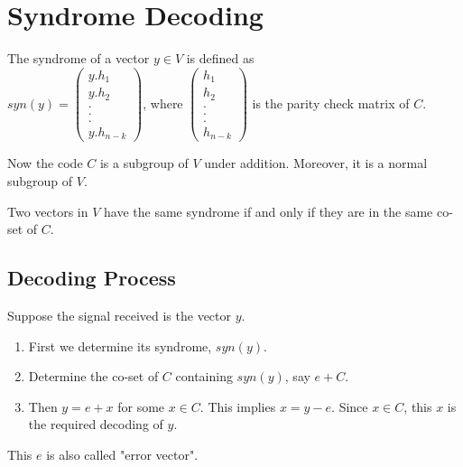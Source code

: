\vspace{9mm}
\section{Syndrome Decoding}
\begin{definition}
  The syndrome of a vector \(y \in V\) is defined as \\ \(syn(y)=\begin{pmatrix}
    y.h_1\\
    y.h_2\\
    .\\
    .\\
    .\\
    y.h_{n-k}
  \end{pmatrix}\), \hspace{12mm} where \(\begin{pmatrix}
    h_1 \\ h_2\\ .\\ .\\ .\\ h_{n-k}
  \end{pmatrix}\) is the parity check matrix of \(C\).
\end{definition}
\vspace{3mm}
Now the code \(C\) is a subgroup of \(V\) under addition. Moreover, it is a normal subgroup of \(V\).
\begin{theorem}
  Two vectors in \(V\) have the same syndrome if and only if they are in the same co-set of \(C\).
\end{theorem}
\clearpage

\subsection{Decoding Process}
Suppose the signal received is the vector \(y\).
\begin{enumerate}
\item First we determine its syndrome, \(syn(y)\).
\item Determine the co-set of \(C\) containing \(syn(y)\), say \(e + C\).
\item Then \(y=e+x\) for some \(x \in C\). This implies \(x=y-e\). Since \(x \in C\), this \(x\) is the required decoding of \(y\).
\end{enumerate}
This \(e\) is also called "error vector".
\vspace{2mm}

